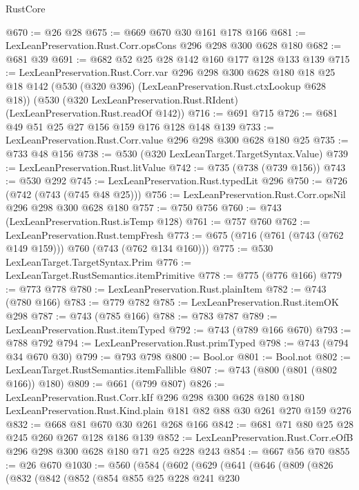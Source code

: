 \begin{lexlean}{RustCore}
\begin{coremodule}
@670 := @26 @28
@675 := @669 @670 @30 @161 @178 @166
@681 := LexLeanPreservation.Rust.Corr.opsCons @296 @298 @300 @628 @180
@682 := @681 @39
@691 := @682 @52 @25 @28 @142 @160 @177 @128 @133 @139
@715 := LexLeanPreservation.Rust.Corr.var
    @296
    @298
    @300
    @628
    @180
    @18
    @25
    @18
    @142
    (@530 (@320 @396) (LexLeanPreservation.Rust.ctxLookup @628 @18))
    (@530 (@320 LexLeanPreservation.Rust.RIdent) (LexLeanPreservation.Rust.readOf @142))
@716 := @691 @715
@726 := @681 @49 @51 @25 @27 @156 @159 @176 @128 @148 @139
@733 := LexLeanPreservation.Rust.Corr.value @296 @298 @300 @628 @180 @25
@735 := @733 @48 @156
@738 := @530 (@320 LexLeanTarget.TargetSyntax.Value)
@739 := LexLeanPreservation.Rust.litValue
@742 := @735 (@738 (@739 @156))
@743 := @530 @292
@745 := LexLeanPreservation.Rust.typedLit @296
@750 := @726 (@742 (@743 (@745 @48 @25)))
@756 := LexLeanPreservation.Rust.Corr.opsNil @296 @298 @300 @628 @180
@757 := @750 @756
@760 := @743 (LexLeanPreservation.Rust.isTemp @128)
@761 := @757 @760
@762 := LexLeanPreservation.Rust.tempFresh
@773 := @675 (@716 (@761 (@743 (@762 @149 @159))) @760 (@743 (@762 @134 @160)))
@775 := @530 LexLeanTarget.TargetSyntax.Prim
@776 := LexLeanTarget.RustSemantics.itemPrimitive
@778 := @775 (@776 @166)
@779 := @773 @778
@780 := LexLeanPreservation.Rust.plainItem
@782 := @743 (@780 @166)
@783 := @779 @782
@785 := LexLeanPreservation.Rust.itemOK @298
@787 := @743 (@785 @166)
@788 := @783 @787
@789 := LexLeanPreservation.Rust.itemTyped
@792 := @743 (@789 @166 @670)
@793 := @788 @792
@794 := LexLeanPreservation.Rust.primTyped
@798 := @743 (@794 @34 @670 @30)
@799 := @793 @798
@800 := Bool.or
@801 := Bool.not
@802 := LexLeanTarget.RustSemantics.itemFallible
@807 := @743 (@800 (@801 (@802 @166)) @180)
@809 := @661 (@799 @807)
@826 := LexLeanPreservation.Rust.Corr.kIf
    @296
    @298
    @300
    @628
    @180
    @180
    LexLeanPreservation.Rust.Kind.plain
    @181
    @82
    @88
    @30
    @261
    @270
    @159
    @276
@832 := @668 @81 @670 @30 @261 @268 @166
@842 := @681 @71 @80 @25 @28 @245 @260 @267 @128 @186 @139
@852 := LexLeanPreservation.Rust.Corr.eOfB @296 @298 @300 @628 @180 @71 @25 @228 @243
@854 := @667 @56 @70
@855 := @26 @670
@1030 := @560
    (@584
      (@602
        (@629
          (@641
            (@646
              (@809
                (@826
                  (@832
                    (@842
                      (@852
                        (@854
                          @855
                          @25
                          @228
                          @241
                          @230

\end{coremodule}
\end{lexlean}
